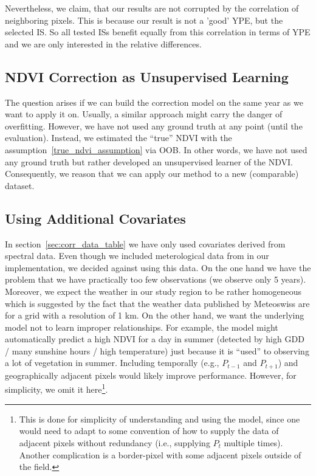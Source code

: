 {{        Nevertheless, we claim, that our results are not corrupted by the correlation of neighboring pixels. This is because our result is not a 'good' YPE, but the selected IS. So all tested ISs benefit equally from this correlation in terms of YPE and we are only interested in the relative differences.

    }

    \subsection{NDVI Correction as Unsupervised Learning}
        The question arises if we can build the correction model on the same year as we want to apply it on. Usually, a similar approach might carry the danger of overfitting. However, we have not used any ground truth at any point (until the evaluation). Instead, we estimated the ``true'' NDVI with the assumption~\ref{true_ndvi_assumption} via OOB. In other words, we have not used any ground truth but rather developed an unsupervised learner of the NDVI. Consequently, we reason that we can apply our method to a new (comparable) dataset.
    \subsection{Using Additional Covariates}{
        In section~\ref{sec:corr_data_table} we have only used covariates derived from spectral data. Even though we included meterological data from \cite{perichPixelbasedCropYield2022} in our implementation,
        we decided against using this data. On the one hand we have the problem that we have practically too few observations (we observe only 5 years). Moreover, we expect the weather in our study region to be rather homogeneous which is suggested by the fact that the weather data published by Meteoswiss are for a grid with a resolution of 1 km. On the other hand, we want the underlying model not to learn improper relationships. For example, the model might automatically predict a high NDVI for a day in summer (detected by high GDD / many sunshine hours / high temperature) just because it is ``used'' to observing a lot of vegetation in summer. 
        Including temporally (e.g., $P_{t-1}$ and $P_{t+1}$) and geographically adjacent pixels would likely improve performance. However, for simplicity, we omit it here\footnote{This is done for simplicity of understanding and using the model, since one would need to adapt to some convention of how to supply the data of adjacent pixels without redundancy (i.e., supplying $P_t$ multiple times). Another complication is a border-pixel with some adjacent pixels outside of the field.}.
    }
}

